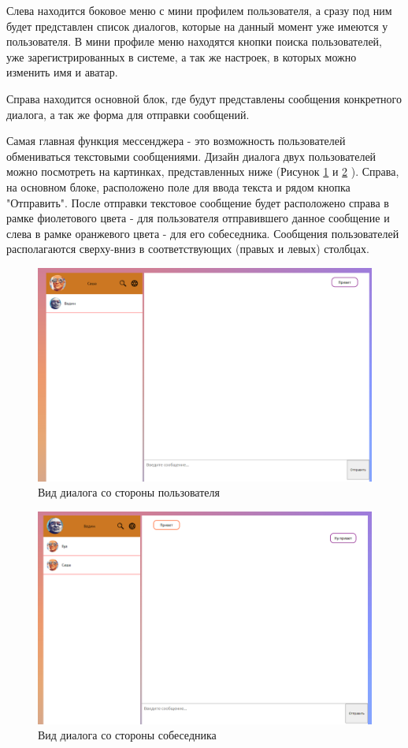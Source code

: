 \documentclass[14pt,final]{report}
\begin{document}
Слева находится боковое меню с мини профилем пользователя, а сразу под ним будет представлен список диалогов, которые на данный момент уже имеются у пользователя. В мини профиле меню находятся кнопки поиска пользователей, уже зарегистрированных в системе, а так же настроек, в которых можно изменить имя и аватар.
\par Справа находится основной блок, где будут представлены сообщения конкретного диалога, а так же форма для отправки сообщений.
\newline
\par
Самая главная функция мессенджера - это возможность пользователей обмениваться текстовыми сообщениями. Дизайн диалога двух пользователей можно посмотреть на картинках, представленных ниже (Рисунок \ref{fig:my_label2} и \ref{fig:my_label3} ). Справа, на основном блоке, расположено поле для ввода текста и рядом кнопка "Отправить". После отправки текстовое сообщение будет расположено справа в рамке фиолетового цвета - для пользователя отправившего данное сообщение и слева в рамке оранжевого цвета - для его собеседника. Сообщения пользователей располагаются сверху-вниз в соответствующих (правых и левых) столбцах.
\begin{figure}[H]
    \centering
    \includegraphics[width=14cm]{perepis.png}
    \caption{Вид диалога со стороны пользователя}
    \label{fig:my_label2}
\end{figure}
\begin{figure}[H]
    \centering
    \includegraphics[width=14cm]{perepis1.png}
    \caption{Вид диалога со стороны собеседника}
    \label{fig:my_label3}
\end{figure}
\end{document}
